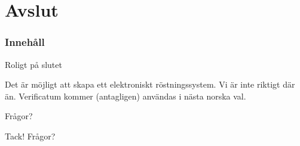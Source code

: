 \section{Avslut}
\begin{frame}
\frametitle{Innehåll}
\tableofcontents[currentsection]
\end{frame}

\begin{frame}{Roligt på slutet}

Det är möjligt att skapa ett elektroniskt röstningssystem. Vi är inte riktigt där än. Verificatum kommer (antagligen) användas i nästa norska val.


\end{frame}

\begin{frame}{Frågor?}

Tack! Frågor?


\end{frame}
